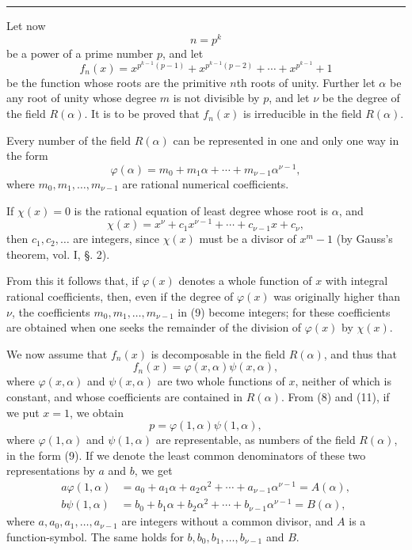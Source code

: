 \documentclass[11pt]{article}
\begin{document}
\medskip\hrule\medskip

Let now
\[
n=p^k
\]
be a power of a prime number $p$, and let
\begin{equation}\tag{8}
f_n(x)=x^{p^{k-1}(p-1)}+x^{p^{k-1}(p-2)}+\cdots+x^{p^{k-1}}+1
\end{equation}
be the function whose roots are the primitive $n$th roots of unity. Further let $\alpha$ be any root of unity whose degree $m$ is not divisible by $p$, and let $\nu$ be the degree of the field $R(\alpha)$. It is to be proved that $f_n(x)$ is irreducible in the field $R(\alpha)$.

Every number of the field $R(\alpha)$ can be represented in one and only one way in the form
\begin{equation}\tag{9}
\varphi(\alpha)=m_0+m_1\alpha+\cdots+m_{\nu-1}\alpha^{\nu-1},
\end{equation}
where $m_0,m_1,\ldots,m_{\nu-1}$ are rational numerical coefficients.

If $\chi(x)=0$ is the rational equation of least degree whose root is $\alpha$, and
\begin{equation}\tag{10}
\chi(x)=x^\nu+c_1x^{\nu-1}+\cdots+c_{\nu-1}x+c_\nu,
\end{equation}
then $c_1,c_2,\ldots$ are integers, since $\chi(x)$ must be a divisor of $x^m-1$ (by Gauss's theorem, vol. I, §. 2).

From this it follows that, if $\varphi(x)$ denotes a whole function of $x$ with integral rational coefficients, then, even if the degree of $\varphi(x)$ was originally higher than $\nu$, the coefficients $m_0,m_1,\ldots,m_{\nu-1}$ in (9) become integers; for these coefficients are obtained when one seeks the remainder of the division of $\varphi(x)$ by $\chi(x)$.

We now assume that $f_n(x)$ is decomposable in the field $R(\alpha)$, and thus that
\begin{equation}\tag{11}
f_n(x)=\varphi(x,\alpha)\psi(x,\alpha),
\end{equation}
where $\varphi(x,\alpha)$ and $\psi(x,\alpha)$ are two whole functions of $x$, neither of which is constant, and whose coefficients are contained in $R(\alpha)$. From (8) and (11), if we put $x=1$, we obtain
\begin{equation}\tag{12}
p=\varphi(1,\alpha)\psi(1,\alpha),
\end{equation}
where $\varphi(1,\alpha)$ and $\psi(1,\alpha)$ are representable, as numbers of the field $R(\alpha)$, in the form (9). If we denote the least common denominators of these two representations by $a$ and $b$, we get
\begin{equation}\tag{13}
\begin{aligned}
a\varphi(1,\alpha)&=a_0+a_1\alpha+a_2\alpha^2+\cdots+a_{\nu-1}\alpha^{\nu-1}=A(\alpha),\\
b\psi(1,\alpha)&=b_0+b_1\alpha+b_2\alpha^2+\cdots+b_{\nu-1}\alpha^{\nu-1}=B(\alpha),
\end{aligned}
\end{equation}
where $a,a_0,a_1,\ldots,a_{\nu-1}$ are integers without a common divisor, and $A$ is a function-symbol. The same holds for $b,b_0,b_1,\ldots,b_{\nu-1}$ and $B$.
\end{document}
